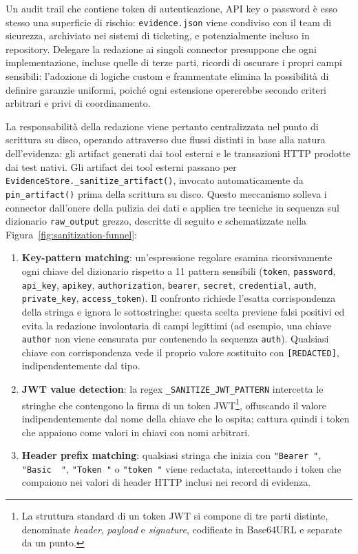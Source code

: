 Un audit trail che contiene token di autenticazione, \gls{API} key o password è esso stesso una superficie di rischio: \texttt{evidence.json} viene condiviso con il team di sicurezza, archiviato nei sistemi di ticketing, e potenzialmente incluso in repository. Delegare la redazione ai singoli connector presuppone che ogni implementazione, incluse quelle di terze parti, ricordi di oscurare i propri campi sensibili: l'adozione di logiche custom e frammentate elimina la possibilità di definire garanzie uniformi, poiché ogni estensione opererebbe secondo criteri arbitrari e privi di coordinamento.

La responsabilità della redazione viene pertanto centralizzata nel punto di scrittura su disco, operando attraverso due flussi distinti in base alla natura dell'evidenza: gli artifact generati dai tool esterni e le transazioni \gls{HTTP} prodotte dai test nativi.
Gli artifact dei tool esterni passano per \texttt{EvidenceStore.\_sanitize\_artifact()}, invocato automaticamente da \texttt{pin\_artifact()} prima della scrittura su disco. Questo meccanismo solleva i connector dall'onere della pulizia dei dati e applica tre tecniche in sequenza sul dizionario \texttt{raw\_output} grezzo, descritte di seguito e schematizzate nella Figura~\ref{fig:sanitization-funnel}:



\begin{enumerate}
      \item \textbf{Key-pattern matching}: un'espressione regolare esamina ricorsivamente ogni chiave del dizionario rispetto a 11 pattern sensibili (\texttt{token}, \texttt{password}, \texttt{api\_key}, \texttt{apikey}, \texttt{authorization}, \texttt{bearer}, \texttt{secret}, \texttt{credential}, \texttt{auth}, \texttt{private\_key}, \texttt{access\_token}). Il confronto richiede l'esatta corrispondenza della stringa e ignora le sottostringhe: questa scelta previene falsi positivi ed evita la redazione involontaria di campi legittimi (ad esempio, una chiave \texttt{author} non viene censurata pur contenendo la sequenza \texttt{auth}). Qualsiasi chiave con corrispondenza vede il proprio valore sostituito con \texttt{[REDACTED]}, indipendentemente dal tipo.
      \item \textbf{\gls{JWT} value detection}: la regex \texttt{\_SANITIZE\_JWT\_PATTERN} intercetta le stringhe che contengono la firma di un token \gls{JWT}\footnote{La struttura standard di un token \gls{JWT} si compone di tre parti distinte, denominate \textit{header}, \textit{payload} e \textit{signature}, codificate in Base64URL e separate da un punto.}, offuscando il valore indipendentemente dal nome della chiave che lo ospita; cattura quindi i token che appaiono come valori in chiavi con nomi arbitrari.
      \item \textbf{Header prefix matching}: qualsiasi stringa che inizia con \texttt{"Bearer "}, \texttt{"Basic~ "}, \texttt{"Token "} o \texttt{"token "} viene redactata, intercettando i token che compaiono nei valori di header \gls{HTTP} inclusi nei record di evidenza.
\end{enumerate}


